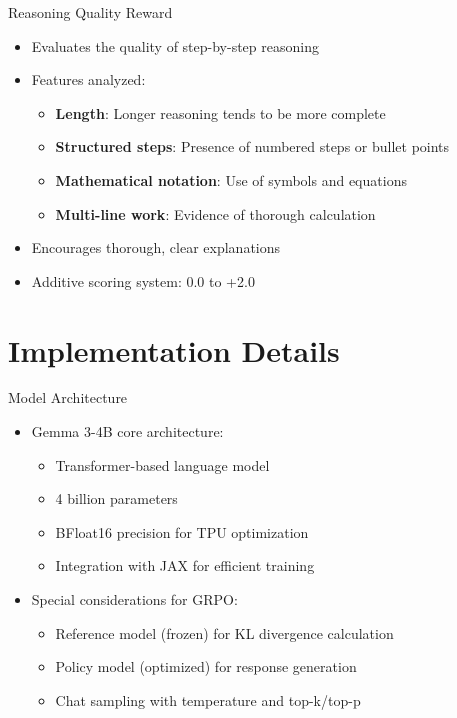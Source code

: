 \documentclass{beamer}
\begin{document}
\begin{frame}{Reasoning Quality Reward}
  \begin{itemize}
    \item Evaluates the quality of step-by-step reasoning
    \item Features analyzed:
    \begin{itemize}
      \item \textbf{Length}: Longer reasoning tends to be more complete
      \item \textbf{Structured steps}: Presence of numbered steps or bullet points
      \item \textbf{Mathematical notation}: Use of symbols and equations
      \item \textbf{Multi-line work}: Evidence of thorough calculation
    \end{itemize}
    \item Encourages thorough, clear explanations
    \item Additive scoring system: 0.0 to +2.0
  \end{itemize}
\end{frame}

\section{Implementation Details}

\begin{frame}{Model Architecture}
  \begin{itemize}
    \item Gemma 3-4B core architecture:
    \begin{itemize}
      \item Transformer-based language model
      \item 4 billion parameters
      \item BFloat16 precision for TPU optimization
      \item Integration with JAX for efficient training
    \end{itemize}
    \item Special considerations for GRPO:
    \begin{itemize}
      \item Reference model (frozen) for KL divergence calculation
      \item Policy model (optimized) for response generation
      \item Chat sampling with temperature and top-k/top-p
    \end{itemize}
  \end{itemize}
\end{frame}
\end{document}
